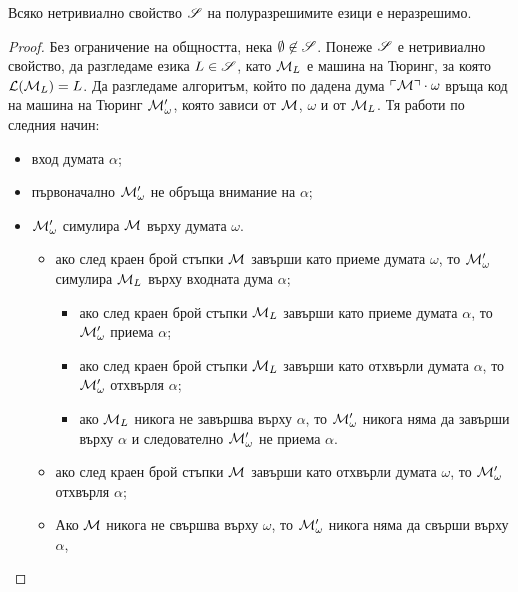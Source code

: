 \begin{framed}
  \begin{thm}[Райс]
    Всяко нетривиално свойство $\mathscr{S}$ на полуразрешимите езици е неразрешимо.
  \end{thm}  
\end{framed}
\begin{proof}
  Без ограничение на общността, нека $\emptyset \not\in \mathscr{S}$.
  Понеже $\mathscr{S}$ е нетривиално свойство, да разгледаме езика $L \in \mathscr{S}$,
  като $\mathcal{M}_L$ е машина на Тюринг, за която $\mathcal{L}(\mathcal{M}_L) = L$.
  Да разгледаме алгоритъм, който по дадена дума $\ulcorner{\mathcal{M}}\urcorner\cdot\omega$
  връща код на машина на Тюринг $\mathcal{M}'_\omega$, която зависи от $\mathcal{M}$, $\omega$ и от $\mathcal{M}_L$.
  Тя работи по следния начин:
  \begin{itemize}
  \item
    вход думата $\alpha$;
  \item
    първоначално $\mathcal{M}'_\omega$ не обръща внимание на $\alpha$;
  \item
    $\mathcal{M}'_\omega$ симулира $\mathcal{M}$ върху думата $\omega$.
    \begin{itemize}
    \item
      ако след краен брой стъпки $\mathcal{M}$ завърши като приеме думата $\omega$, то 
      $\mathcal{M}'_\omega$ симулира $\mathcal{M}_L$ върху входната дума $\alpha$;
      \begin{itemize}
      \item
        ако след краен брой стъпки $\mathcal{M}_L$ завърши като приеме думата $\alpha$, то 
        $\mathcal{M}'_\omega$ приема $\alpha$;
      \item 
        ако след краен брой стъпки $\mathcal{M}_L$ завърши като отхвърли думата $\alpha$, то 
        $\mathcal{M}'_\omega$ отхвърля $\alpha$;
      \item
        ако $\mathcal{M}_L$ никога не завършва върху $\alpha$, то 
        $\mathcal{M}'_\omega$ никога няма да завърши върху $\alpha$ и следователно $\mathcal{M}'_\omega$
        не приема $\alpha$.
      \end{itemize}
    \item
      ако след краен брой стъпки $\mathcal{M}$ завърши като отхвърли думата $\omega$, то 
      $\mathcal{M}'_\omega$ отхвърля $\alpha$;
    \item
      Ако $\mathcal{M}$ никога не свършва върху $\omega$, то $\mathcal{M}'_\omega$ никога няма да свърши върху $\alpha$,

\end{itemize}
\end{itemize}
\end{proof}
